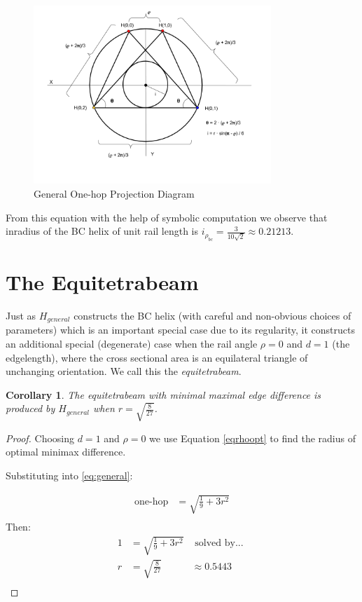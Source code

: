 \documentclass[11pt]{article}
\newtheorem{corollary}{Corollary}
\begin{document}
\begin{figure}[H]
  \label{projectiondiagram}
     \centering
     \includegraphics[width=0.8\textwidth]{figures/ProjectionDiagram.png}
     \caption{General One-hop Projection Diagram}
\end{figure}

From this equation with the help of symbolic computation we observe that inradius of the BC helix of unit rail length is $i_{\rho_{bc}} = \frac{3}{10\sqrt{2}} \approx 0.21213$.

\section{The Equitetrabeam}
\label{sec:equitetrabeam}

Just as $H_{general}$ constructs the BC helix (with careful and non-obvious choices of parameters)
which is an important
special case due to its regularity, it constructs an additional special
(degenerate) case when the rail angle $\rho = 0$
and $d = 1$ (the edgelength), where the cross sectional area is
an equilateral triangle of unchanging orientation.
We call this the \emph{equitetrabeam}.


\begin{corollary}
  The equitetrabeam with minimal maximal edge difference is produced
  by $H_{general}$ when $ r = \sqrt{\frac{8}{27}} $.
\end{corollary}

\begin{proof}
Choosing $d = 1$ and $\rho = 0$ we use Equation \eqref{eqrhoopt} to find the radius of 
optimal minimax difference.

Substituting into \eqref{eq:general}:

\begin{align*}
  \text{one-hop} &= \sqrt{\frac{1}{9} + 3r^2}\\
\end{align*}
Then:
\begin{align*}
   1  &=  \sqrt{\frac{1}{9} + 3r^2} & \text{ solved by... }\\
   r  &= \sqrt{\frac{8}{27}} &\approx 0.5443 \\
\end{align*}
\end{proof}
\end{document}
